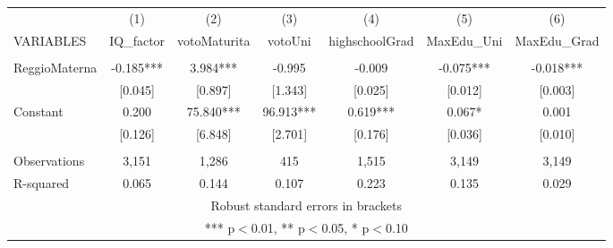 \begin{tabular}{lcccccc} \hline
 & (1) & (2) & (3) & (4) & (5) & (6) \\
VARIABLES & IQ\_factor & votoMaturita & votoUni & highschoolGrad & MaxEdu\_Uni & MaxEdu\_Grad \\ \hline
 &  &  &  &  &  &  \\
ReggioMaterna & -0.185*** & 3.984*** & -0.995 & -0.009 & -0.075*** & -0.018*** \\
 & [0.045] & [0.897] & [1.343] & [0.025] & [0.012] & [0.003] \\
Constant & 0.200 & 75.840*** & 96.913*** & 0.619*** & 0.067* & 0.001 \\
 & [0.126] & [6.848] & [2.701] & [0.176] & [0.036] & [0.010] \\
 &  &  &  &  &  &  \\
Observations & 3,151 & 1,286 & 415 & 1,515 & 3,149 & 3,149 \\
 R-squared & 0.065 & 0.144 & 0.107 & 0.223 & 0.135 & 0.029 \\ \hline
\multicolumn{7}{c}{ Robust standard errors in brackets} \\
\multicolumn{7}{c}{ *** p$<$0.01, ** p$<$0.05, * p$<$0.10} \\
\end{tabular}
